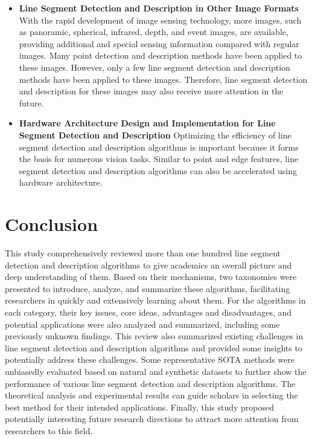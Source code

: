 \documentclass[journal,compsoc]{IEEEtran}
\begin{document}
\begin{itemize}
	\item \textbf{Line Segment Detection and Description in Other Image Formats}
	With the rapid development of image sensing technology, more images, such as panoramic, spherical, infrared, depth, and event images, are available, providing additional and special sensing information compared with regular images. Many point detection and description methods have been applied to these images. However, only a few line segment detection \cite{ULSD,DetectingLineSegmentsinMotionblurredImageswithEvents} and description methods have been applied to these images. Therefore, line segment detection and description for these images may also receive more attention in the future.
		
	\item \textbf{Hardware Architecture Design and Implementation for Line Segment Detection and Description}
	Optimizing the efficiency of line segment detection and description algorithms is important because it forms the basis for numerous vision tasks. Similar to point \cite{8304764,8382255} and edge \cite{6378440,9546047} features, line segment detection and description algorithms can also be accelerated using hardware architecture.
\end{itemize}


\section{Conclusion}
\label{sec_conclusion}
This study comprehensively reviewed more than one hundred line segment detection and description algorithms to give academics an overall picture and deep understanding of them. Based on their mechanisms, two taxonomies were presented to introduce, analyze, and summarize these algorithms, facilitating researchers in quickly and extensively learning about them. For the algorithms in each category, their key issues, core ideas, advantages and disadvantages, and potential applications were also analyzed and summarized, including some previously unknown findings. This review also summarized existing challenges in line segment detection and description algorithms and provided some insights to potentially address these challenges. Some representative SOTA methods were unbiasedly evaluated based on natural and synthetic datasets to further show the performance of various line segment detection and description algorithms. The theoretical analysis and experimental results can guide scholars in selecting the best method for their intended applications. Finally, this study proposed potentially interesting future research directions to attract more attention from researchers to this field.



\end{document}
